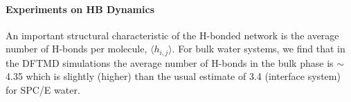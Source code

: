 {\FloatBarrier
\paragraph{Experiments on HB Dynamics}
An important  structural characteristic of the H-bonded network is the average number of H-bonds per molecule, $\langle h_{i,j}\rangle$. \cite{Chowdhary2008} 
For bulk water systems, we find that in the DFTMD simulations the average number of H-bonds in the bulk phase is $\sim$ 4.35 which is slightly
(higher) than the usual estimate of 3.4 (interface system) for SPC/E water.


}
